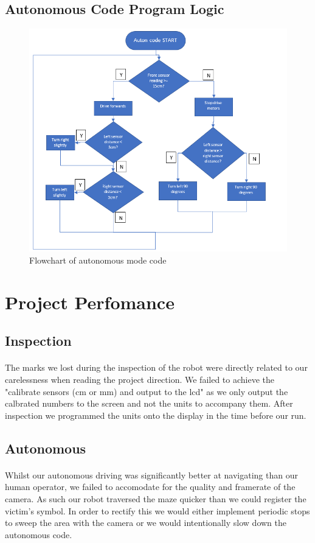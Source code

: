 \documentclass[12pt, a4paper]{article}
\begin{document}
      \subsection{Autonomous Code Program Logic}
        \begin{figure}[h]
          \includegraphics[width=0.6\columnwidth]{Images/auton.png}
          \centering
          \caption{Flowchart of autonomous mode code}
          \label{fig:Flowchart:auton}
        \end{figure}

  \newpage 
        \section{Project Perfomance} \label{sec:Perfomance}
          \subsection{Inspection}
            \paragraph{}
              The marks we lost during the inspection of the robot were directly related to our carelessness when reading the project direction. We failed to achieve the "calibrate sensors (cm or mm) and output to the lcd" as we only output the calbrated numbers to the screen and not the units to accompany them. After inspection we programmed the units onto the display in the time before our run.

          \subsection{Autonomous}
            \paragraph{}
              Whilst our autonomous driving was significantly better at navigating than our human operator, we failed to accomodate for the quality and framerate of the camera. As such our robot traversed the maze quicker than we could register the victim's symbol. In order to rectify this we would either implement periodic stops to sweep the area with the camera or we would intentionally slow down the autonomous code. 
\end{document}

